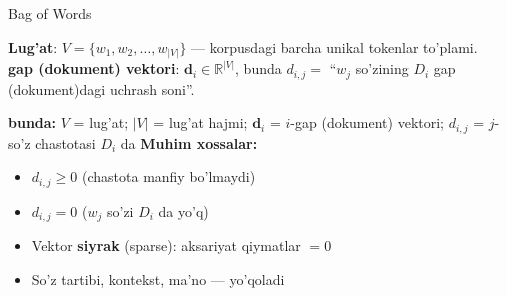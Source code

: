 \documentclass[aspectratio=169,11pt]{beamer}
\newcommand{\bunda}[1]{{\small\textbf{bunda:}\; #1}}
\begin{document}
\begin{frame}{Bag of Words}
  \begin{tcolorbox}[defbox,title=Ta'rif: Bag of Words]
    \textbf{Lug'at}: $V = \{w_1, w_2, \ldots, w_{|V|}\}$ ---
    korpusdagi barcha unikal tokenlar to'plami.\\[5pt]
    \textbf{gap (dokument) vektori}: $\mathbf{d}_i \in \mathbb{R}^{|V|}$,
    bunda $d_{i,j} = $ ``$w_j$ so'zining $D_i$ gap (dokument)dagi
    uchrash soni''.
  \end{tcolorbox}
  \vspace{5pt}
  \bunda{%
    $V$ = lug'at; $|V|$ = lug'at hajmi;
    $\mathbf{d}_i$ = $i$-gap (dokument) vektori;
    $d_{i,j}$ = $j$-so'z chastotasi $D_i$ da
  }
  \vspace{5pt}
  \textbf{Muhim xossalar:}\\[3pt]
  \small
  \begin{itemize}\setlength\itemsep{3pt}
    \item $d_{i,j} \geq 0$ \quad (chastota manfiy bo'lmaydi)
    \item $d_{i,j} = 0$ \quad ($w_j$ so'zi $D_i$ da yo'q)
    \item Vektor \textbf{siyrak} (sparse): aksariyat qiymatlar $= 0$
    \item So'z tartibi, kontekst, ma'no --- \alert{yo'qoladi}
  \end{itemize}
\end{frame}
\end{document}
